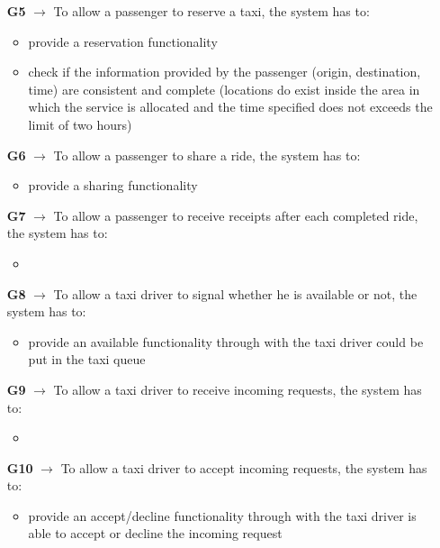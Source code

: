 \begin{itemize}
	\item [\textbf{G5}] $\rightarrow$ To allow a passenger to reserve a taxi, the system has to:
	\begin{itemize}
		\item provide a reservation functionality
		\item check if the information provided by the passenger (origin, destination, time) are consistent and complete (locations do exist inside the area in which the service is allocated and the time specified does not exceeds the limit of two hours)
	\end{itemize}
	
	\item [\textbf{G6}] $\rightarrow$ To allow a passenger to share a ride, the system has to:
	\begin{itemize}
		\item provide a sharing functionality
	\end{itemize}

	\item [\textbf{G7}] $\rightarrow$ To allow a passenger to receive receipts after each completed ride, the system has to:
	\begin{itemize}
		\item
	\end{itemize}
	
	\item [\textbf{G8}] $\rightarrow$ To allow a taxi driver to signal whether he is available or not, the system has to:
	\begin{itemize}
		\item provide an available functionality through with the taxi driver could be put in the taxi queue
	\end{itemize}
	
	\item [\textbf{G9}] $\rightarrow$ To allow a taxi driver to receive incoming requests, the system has to:
	\begin{itemize}
		\item
	\end{itemize}
	
	\item [\textbf{G10}] $\rightarrow$ To allow a taxi driver to accept incoming requests, the system has to:
	\begin{itemize}
		\item provide an accept/decline functionality through with the taxi driver is able to accept or decline the incoming request
	\end{itemize}		
	

\end{itemize}

